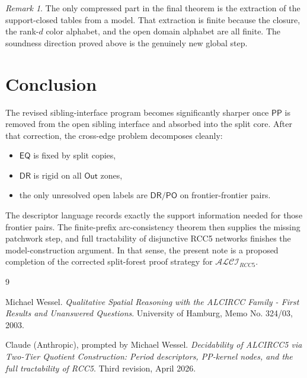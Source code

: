 \documentclass[11pt]{article}
\theoremstyle{remark}
\newtheorem{remark}[definition]{Remark}
\newcommand{\DR}{\mathsf{DR}}
\newcommand{\PO}{\mathsf{PO}}
\newcommand{\PP}{\mathsf{PP}}
\newcommand{\EQ}{\mathsf{EQ}}
\newcommand{\Out}{\mathsf{Out}}
\begin{document}
\begin{remark}
The only compressed part in the final theorem is the extraction of the support-closed tables from a model. That extraction is finite because the closure, the rank-$d$ color alphabet, and the open domain alphabet are all finite. The soundness direction proved above is the genuinely new global step.
\end{remark}

\section{Conclusion}

The revised sibling-interface program becomes significantly sharper once $\PP$ is removed from the open sibling interface and absorbed into the split core. After that correction, the cross-edge problem decomposes cleanly:
\begin{itemize}
    \item $\EQ$ is fixed by split copies,
    \item $\DR$ is rigid on all $\Out$ zones,
    \item the only unresolved open labels are $\DR/\PO$ on frontier-frontier pairs.
\end{itemize}
The descriptor language records exactly the support information needed for those frontier pairs. The finite-prefix arc-consistency theorem then supplies the missing patchwork step, and full tractability of disjunctive RCC5 networks finishes the model-construction argument. In that sense, the present note is a proposed completion of the corrected split-forest proof strategy for $\mathcal{ALCI}_{RCC5}$.

\begin{thebibliography}{9}

Michael Wessel.
\newblock \emph{Qualitative Spatial Reasoning with the ALCIRCC Family - First Results and Unanswered Questions}.
\newblock University of Hamburg, Memo No. 324/03, 2003.

Claude (Anthropic), prompted by Michael Wessel.
\newblock \emph{Decidability of ALCIRCC5 via Two-Tier Quotient Construction: Period descriptors, PP-kernel nodes, and the full tractability of RCC5}.
\newblock Third revision, April 2026.

\end{thebibliography}
\end{document}
